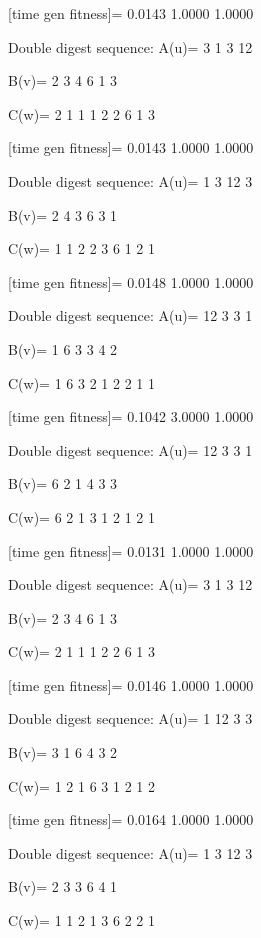 [time gen fitness]=
    0.0143    1.0000    1.0000

Double digest sequence:
A(u)=
     3     1     3    12

B(v)=
     2     3     4     6     1     3

C(w)=
     2     1     1     1     2     2     6     1     3

[time gen fitness]=
    0.0143    1.0000    1.0000

Double digest sequence:
A(u)=
     1     3    12     3

B(v)=
     2     4     3     6     3     1

C(w)=
     1     1     2     2     3     6     1     2     1

[time gen fitness]=
    0.0148    1.0000    1.0000

Double digest sequence:
A(u)=
    12     3     3     1

B(v)=
     1     6     3     3     4     2

C(w)=
     1     6     3     2     1     2     2     1     1

[time gen fitness]=
    0.1042    3.0000    1.0000

Double digest sequence:
A(u)=
    12     3     3     1

B(v)=
     6     2     1     4     3     3

C(w)=
     6     2     1     3     1     2     1     2     1

[time gen fitness]=
    0.0131    1.0000    1.0000

Double digest sequence:
A(u)=
     3     1     3    12

B(v)=
     2     3     4     6     1     3

C(w)=
     2     1     1     1     2     2     6     1     3

[time gen fitness]=
    0.0146    1.0000    1.0000

Double digest sequence:
A(u)=
     1    12     3     3

B(v)=
     3     1     6     4     3     2

C(w)=
     1     2     1     6     3     1     2     1     2

[time gen fitness]=
    0.0164    1.0000    1.0000

Double digest sequence:
A(u)=
     1     3    12     3

B(v)=
     2     3     3     6     4     1

C(w)=
     1     1     2     1     3     6     2     2     1

